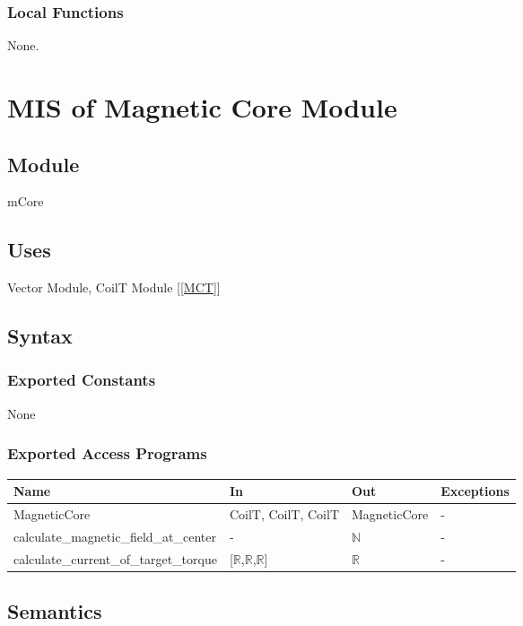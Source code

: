 \documentclass[12pt, titlepage]{article}
\begin{document}
\subsubsection{Local Functions}
None.



\section{MIS of Magnetic Core Module} \label{MMC}

\subsection{Module}
mCore

\subsection{Uses}
Vector Module, CoilT Module [\ref{MCT}]

\subsection{Syntax}

\subsubsection{Exported Constants}
None
\subsubsection{Exported Access Programs}

\begin{center}
\begin{tabular}{p{6cm} p{4cm} p{3cm} p{2cm}}
\hline
\textbf{Name} & \textbf{In} & \textbf{Out} & \textbf{Exceptions} \\
\hline
MagneticCore  & CoilT, CoilT, CoilT & MagneticCore   & - \\
\hline
calculate\_magnetic\_field\_at\_center & - & $\mathbb{N}$  & -  \\
\hline
calculate\_current\_of\_target\_torque & [$\mathbb{R}$,$\mathbb{R}$,$\mathbb{R}$] & $\mathbb{R}$  & -  \\
\hline
\end{tabular}
\end{center}

\subsection{Semantics}
\end{document}
